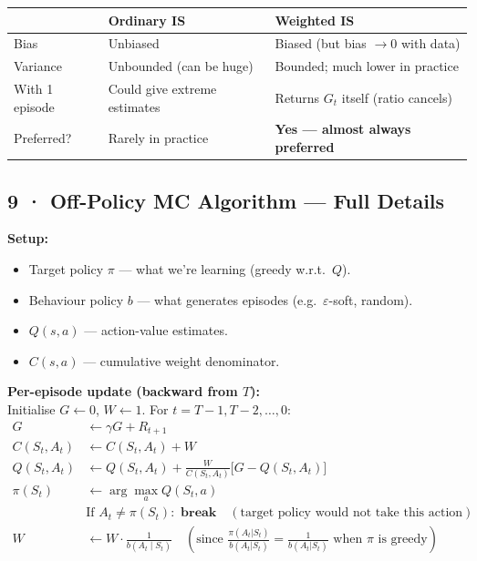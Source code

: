 \documentclass[11pt,a4paper]{article}
\begin{document}
\begin{center}\small
\begin{tabular}{p{3.5cm}p{5cm}p{5cm}}
\toprule
& \textbf{Ordinary IS} & \textbf{Weighted IS} \\
\midrule
Bias & Unbiased & Biased (but bias $\to 0$ with data) \\
Variance & Unbounded (can be huge) & Bounded; much lower in practice \\
With 1 episode & Could give extreme estimates & Returns $G_t$ itself (ratio cancels) \\
Preferred? & Rarely in practice & \textbf{Yes — almost always preferred} \\
\bottomrule
\end{tabular}
\end{center}

\subsection*{9 · Off-Policy MC Algorithm — Full Details}

\begin{tcolorbox}[exam={Off-Policy MC Control (Weighted IS) — How It Works}]
\textbf{Setup:}
\begin{itemize}
  \item Target policy $\pi$ — what we're learning (greedy w.r.t.\ $Q$).
  \item Behaviour policy $b$ — what generates episodes (e.g.\ $\varepsilon$-soft, random).
  \item $Q(s,a)$ — action-value estimates.
  \item $C(s,a)$ — cumulative weight denominator.
\end{itemize}

\textbf{Per-episode update (backward from $T$):}\\
Initialise $G \leftarrow 0$, $W \leftarrow 1$.
For $t = T-1, T-2, \ldots, 0$:
\begin{align*}
  G &\leftarrow \gamma G + R_{t+1} \\
  C(S_t, A_t) &\leftarrow C(S_t, A_t) + W \\
  Q(S_t, A_t) &\leftarrow Q(S_t, A_t) + \frac{W}{C(S_t, A_t)}\bigl[G - Q(S_t, A_t)\bigr] \\
  \pi(S_t) &\leftarrow \arg\max_a Q(S_t, a) \\
  &\text{If } A_t \neq \pi(S_t): \textbf{ break} \quad (\text{target policy would not take this action}) \\
  W &\leftarrow W \cdot \frac{1}{b(A_t \mid S_t)} \quad
      \left(\text{since } \frac{\pi(A_t|S_t)}{b(A_t|S_t)} = \frac{1}{b(A_t|S_t)} \text{ when } \pi \text{ is greedy}\right)
\end{align*}
\end{tcolorbox}
\end{document}
